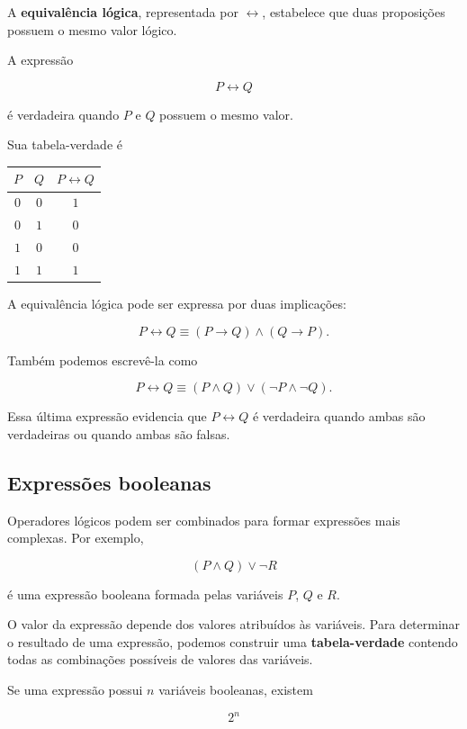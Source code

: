 \documentclass[
  brazilian,
  letterpaper,
]{book}
\theoremstyle{plain}
\theoremstyle{definition}
\theoremstyle{remark}
\begin{document}
A \textbf{equivalência lógica}, representada por \(\leftrightarrow\),
estabelece que duas proposições possuem o mesmo valor lógico.

A expressão

\[
P\leftrightarrow Q
\]

é verdadeira quando \(P\) e \(Q\) possuem o mesmo valor.

Sua tabela-verdade é

\begin{longtable*}[]{|c|c|c|}
\toprule\noalign{}
\(P\) & \(Q\) & \(P\leftrightarrow Q\) \\
\midrule\noalign{}
\endhead
\bottomrule\noalign{}
\endlastfoot
\(0\) & \(0\) & \(1\) \\
\midrule
\(0\) & \(1\) & \(0\) \\
\midrule
\(1\) & \(0\) & \(0\) \\
\midrule
\(1\) & \(1\) & \(1\) \\
\end{longtable*}

A equivalência lógica pode ser expressa por duas implicações:

\[
P\leftrightarrow Q
\equiv
(P\rightarrow Q)\wedge(Q\rightarrow P).
\]

Também podemos escrevê-la como

\[
P\leftrightarrow Q
\equiv
(P\wedge Q)\vee(\neg P\wedge\neg Q).
\]

Essa última expressão evidencia que \(P\leftrightarrow Q\) é verdadeira
quando ambas são verdadeiras ou quando ambas são falsas.

\subsection{Expressões booleanas}\label{expressuxf5es-booleanas}

Operadores lógicos podem ser combinados para formar expressões mais
complexas. Por exemplo,

\[
(P\wedge Q)\vee\neg R
\]

é uma expressão booleana formada pelas variáveis \(P\), \(Q\) e \(R\).

O valor da expressão depende dos valores atribuídos às variáveis. Para
determinar o resultado de uma expressão, podemos construir uma
\textbf{tabela-verdade} contendo todas as combinações possíveis de
valores das variáveis.

Se uma expressão possui \(n\) variáveis booleanas, existem

\[
2^n
\]
\end{document}

